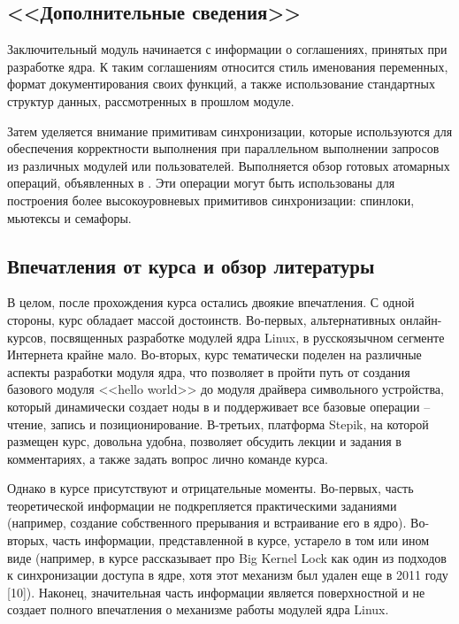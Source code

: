 
\subsection{<<Дополнительные сведения>>}

Заключительный модуль начинается с информации о соглашениях, принятых при разработке ядра. К таким соглашениям относится стиль именования переменных, формат документирования своих функций, а также использование стандартных структур данных, рассмотренных в прошлом модуле.

Затем уделяется внимание примитивам синхронизации, которые используются для обеспечения корректности выполнения при параллельном выполнении запросов из различных модулей или пользователей. Выполняется обзор готовых атомарных операций, объявленных в . Эти операции могут быть использованы для построения более высокоуровневых примитивов синхронизации: спинлоки, мьютексы и семафоры.

\subsection{Впечатления от курса и обзор литературы}

В целом, после прохождения курса остались двоякие впечатления. С одной стороны, курс обладает массой достоинств. Во-первых, альтернативных онлайн-курсов, посвященных разработке модулей ядра Linux, в русскоязычном сегменте Интернета крайне мало. Во-вторых, курс тематически поделен на различные аспекты разработки модуля ядра, что позволяет в пройти путь от создания базового модуля <<hello world>> до модуля драйвера символьного устройства, который динамически создает ноды в  и поддерживает все базовые операции -- чтение, запись и позиционирование. В-третьих, платформа Stepik, на которой размещен курс, довольна удобна, позволяет обсудить лекции и задания в комментариях, а также задать вопрос лично команде курса.

Однако в курсе присутствуют и отрицательные моменты. Во-первых, часть теоретической информации не подкрепляется практическими заданиями (например, создание собственного прерывания и встраивание его в ядро). Во-вторых, часть информации, представленной в курсе, устарело в том или ином виде (например, в курсе рассказывает про Big Kernel Lock как один из подходов к синхронизации доступа в ядре, хотя этот механизм был удален еще в 2011 году [10]). Наконец, значительная часть информации является поверхностной и не создает полного впечатления о механизме работы модулей ядра Linux.

